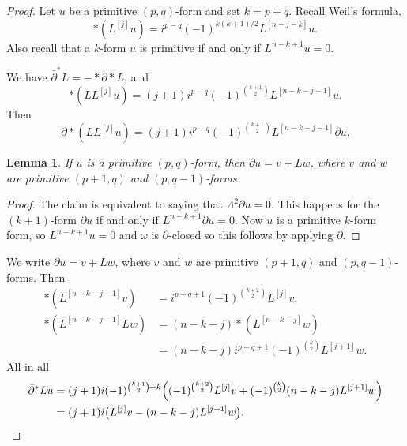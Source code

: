 \documentclass[11pt]{amsart}
\newtheorem{lemm}[theo]{Lemma}
\theoremstyle{definition}
\def\^#1{^{[#1]}}
\begin{document}
\begin{proof}
Let $u$ be a primitive $(p,q)$-form and set $k = p + q$.
Recall Weil's formula,
$$
*(L^{[j]} u)
= i^{p-q} (-1)^{k(k+1)/2} L^{[n-j-k]} u.
$$
Also recall that a $k$-form $u$ is primitive if and only if $L^{n-k+1} u = 0$.


We have
$\bar\partial^* L = - * \partial * L$, and
$$
*(L L\^{j}u)
= (j+1) i^{p-q} (-1)^{\binom{k+1}2} L\^{n-k-j-1} u.
$$
Then
$$
\partial {*}(L L\^{j}u)
= (j+1) i^{p-q} (-1)^{\binom{k+1}2} L\^{n-k-j-1} \partial u .
$$

\begin{lemm}
If $u$ is a primitive $(p,q)$-form, then $\partial u = v + L w$, where $v$ and
$w$ are primitive $(p+1,q)$ and $(p,q-1)$-forms.
\end{lemm}

\begin{proof}
The claim is equivalent to saying that $\Lambda^2 \partial u = 0$.
This happens for the $(k+1)$-form $\partial u$ if and only if $L^{n-k+1}
\partial u = 0$.
Now $u$ is a primitive $k$-form form, so $L^{n-k+1} u = 0$ and $\omega$ is
$\partial$-closed so this follows by applying $\partial$.
\end{proof}

We write $\partial u = v + L w$, where $v$ and $w$ are primitive $(p+1,q)$
and $(p,q-1)$-forms.
Then
\begin{align*}
*(L\^{n-k-j-1} v)
&= i^{p-q+1} (-1)^{\binom{k+2}2}
L\^{j} v,
\\
*(L\^{n-k-j-1} Lw)
&= (n-k-j) {*}(L\^{n-k-j} w)
\\
&= (n-k-j) i^{p-q+1} (-1)^{\binom{k}2}
L\^{j+1} w.
\end{align*}
All in all
\begin{align*}
\bar\partial^*L u
&=
(j+1) i (-1)^{\binom{k+1}2 + k}
\Bigl(
(-1)^{\binom{k+2}{2}} L\^{j} v
+ (-1)^{\binom{k}{2}} (n-k-j) L\^{j+1} w
\Bigr)
\\
&=
(j+1) i
\bigl(
L\^{j} v - (n-k-j) L\^{j+1} w
\bigr).
\end{align*}


\end{proof}
\end{document}
